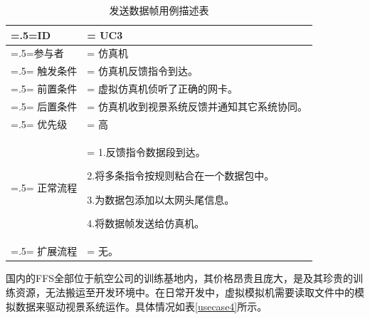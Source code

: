 \begin{table}[htbp]
    \begin{center}
        \caption{发送数据帧用例描述表}
        \label{usecase3}
        \renewcommand\arraystretch{1.5}
        \begin{tabularx}{0.8\textwidth}{ 
            | >{\centering\arraybackslash\hsize=.5\hsize\linewidth=\hsize}X 
            | >{\raggedright\arraybackslash\hsize=1.5\hsize\linewidth=\hsize}X 
            | }
            \hline
            \textbf{ID} & \textbf{UC3}\\
            \hline
            参与者 & 仿真机\\
            \hline
            触发条件 & 仿真机反馈指令到达。\\
            \hline
            前置条件 & 虚拟仿真机侦听了正确的网卡。\\
            \hline
            后置条件 & 仿真机收到视景系统反馈并通知其它系统协同。\\
            \hline
            优先级 & 高\\
            \hline
            正常流程 & 1.反馈指令数据段到达。\par 2.将多条指令按规则粘合在一个数据包中。\par 3.为数据包添加以太网头尾信息。\par 4.将数据帧发送给仿真机。\\
            \hline
            扩展流程 & 无。\\
            \hline
        \end{tabularx}
    \end{center}
\end{table}
\par
国内的FFS全部位于航空公司的训练基地内，其价格昂贵且庞大，是及其珍贵的训练资源，无法搬运至开发环境中。在日常开发中，虚拟模拟机需要读取文件中的模拟数据来驱动视景系统运作。具体情况如表\ref{usecase4}所示。
